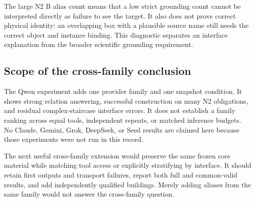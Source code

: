 The large N2 B alias count means that a low strict grounding count cannot be interpreted directly as failure to see the target. It also does not prove correct physical identity: an overlapping box with a plausible source name still needs the correct object and instance binding. This diagnostic separates an interface explanation from the broader scientific grounding requirement.

\subsection{Scope of the cross-family conclusion}
The Qwen experiment adds one provider family and one snapshot condition. It shows strong relation answering, successful construction on many N2 obligations, and residual complex-staircase interface errors. It does not establish a family ranking across equal tools, independent repeats, or matched inference budgets. No Claude, Gemini, Grok, DeepSeek, or Seed results are claimed here because those experiments were not run in this record.

The next useful cross-family extension would preserve the same frozen core material while matching tool access or explicitly stratifying by interface. It should retain first outputs and transport failures, report both full and common-valid results, and add independently qualified buildings. Merely adding aliases from the same family would not answer the cross-family question.
